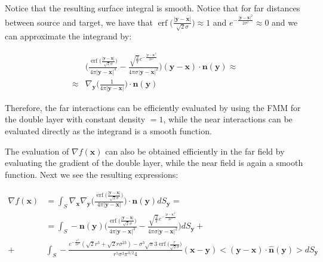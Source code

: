 \documentclass[11pt]{article}
\DeclareMathOperator\erf{erf}
\newcommand\bx{\boldsymbol x}
\newcommand\by{\boldsymbol y}
\newcommand\bn{\boldsymbol n}
\begin{document}
Notice that the resulting surface integral is smooth. Notice that for far distances between source and target, we have that $\erf\big(\frac{|\by-\bx|}{\sqrt{2}\sigma}\big)\approx 1$ and $e^{-\frac{|\by-\bx|^2}{2\sigma^2}}\approx 0$ and we can approximate the integrand by:

\begin{equation}
\begin{aligned}
&\Bigg(\frac{\erf\big(\frac{|\by-\bx|}{\sqrt{2}\sigma}\big)}{4\pi|\by-\bx|^3}-\frac{\sqrt{\frac{2}{\pi}}e^{-\frac{|\by-\bx|^2}{2\sigma^2}}}{4\pi\sigma|\by-\bx|^2}\Bigg)(\by-\bx)\cdot\bn(\by)\approx\\
\approx &\nabla_{\by}\Big(\frac{1}{4\pi|\by-\bx|}\Big)\cdot\bn(\by)
\end{aligned}
\end{equation}

Therefore, the far interactions can be efficiently evaluated by using the FMM for the double layer with constant density $=1$, while the near interactions can be evaluated directly as the integrand is a smooth function.

The evaluation of $\nabla f(\bx)$ can also be obtained efficiently in the far field by evaluating the gradient of the double layer, while the near field is again a smooth function. Next we see the resulting expressions:

\begin{equation}\label{surf_nablaf}
\begin{aligned}
\nabla f(\bx)&=\int_{\mathit{S}}\nabla_{\bx}\nabla_{\by}\Big(\frac{\erf\big(\frac{|\by-\bx|}{\sqrt{2}\sigma}\big)}{4\pi|\by-\bx|}\Big)\cdot\bn(\by)dS_{\by}=\\
&=\int_{\mathit{S}}-\bn(\by)\Bigg(\frac{\erf\big(\frac{|\by-\bx|}{\sqrt{2}\sigma}\big)}{4\pi|\by-\bx|^3}-\frac{\sqrt{\frac{2}{\pi}}e^{-\frac{|\by-\bx|^2}{2\sigma^2}}}{4\pi\sigma|\by-\bx|^2}\Bigg)dS_{\by}+\\
+&\int_{\mathit{S}} -\frac{e^{-\frac{r^2}{2\sigma^2}}(\sqrt{2}r^3+\sqrt{2}r\sigma^23)-\sigma^3\sqrt{\pi}3\erf{\big(\frac{r}{\sqrt{2}\sigma}}\big)}{r^5\sigma^3\pi^{3/2}4}(\bx-\by)<(\by-\bx)\cdot \hat{\bn}(\by)>dS_{\by}
\end{aligned}
\end{equation}

\end{document}

